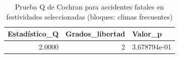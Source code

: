 \begin{table}[ht]
\centering
\begin{tabular}{rrl}
  \hline
Estadístico\_Q & Grados\_libertad & Valor\_p \\ 
  \hline
2.0000 &     2 & 3.678794e-01 \\ 
   \hline
\end{tabular}
\caption{Prueba Q de Cochran para accidentes fatales en festividades seleccionadas (bloques: climas frecuentes)} 
\label{tab:cochran_q_top_festivos_clima}
\end{table}

